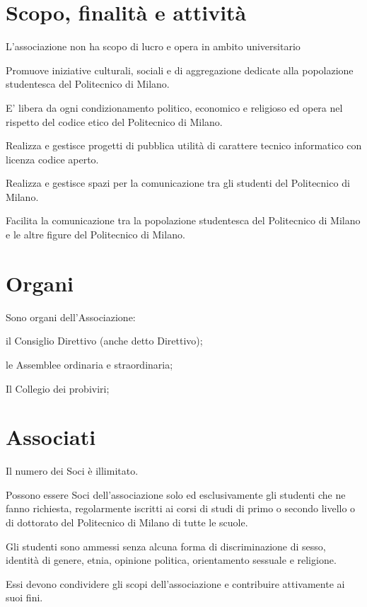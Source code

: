 \documentclass[legalpaper, 11pt]{exam}
\let\tempone\enumerate
\let\temptwo\endenumerate
\renewenvironment{enumerate}{\tempone\addtolength{\itemsep}{-0.45\baselineskip}}{\temptwo}
\begin{document}
{\section{Scopo, finalità e attività}
\begin{enumerate}
 \item L’associazione non ha scopo di lucro e opera in ambito universitario
 \item Promuove iniziative culturali, sociali e di aggregazione dedicate alla popolazione studentesca del Politecnico di Milano.
 \item E’ libera da ogni condizionamento politico, economico e religioso ed opera nel rispetto del codice etico del Politecnico di Milano.
 \item Realizza e gestisce progetti di pubblica utilità di carattere tecnico informatico con licenza codice aperto.
 \item Realizza e gestisce spazi per la comunicazione tra gli studenti del Politecnico di Milano.
 \item Facilita la comunicazione tra la popolazione studentesca del Politecnico di Milano e le altre figure del Politecnico di Milano.
\end{enumerate}

\section{Organi}
Sono organi dell’Associazione: 
\vspace{-5pt}
\begin{enumerate}
	\item il Consiglio Direttivo (anche detto Direttivo);
	\item le Assemblee ordinaria e straordinaria;
	\item Il Collegio dei probiviri;
\end{enumerate}

\section{Associati}
\begin{enumerate}
 \item Il numero dei Soci è illimitato. 
 \item Possono essere Soci dell’associazione solo ed esclusivamente gli studenti che ne fanno richiesta, regolarmente iscritti ai corsi di studi di primo o secondo livello o di dottorato del Politecnico di Milano di tutte le scuole.
 \item Gli studenti sono ammessi senza alcuna forma di discriminazione di sesso, identità di genere, etnia, opinione politica, orientamento sessuale e religione.
 \item Essi devono condividere gli scopi dell’associazione e contribuire attivamente ai suoi fini.
\end{enumerate}

}
\end{document}
